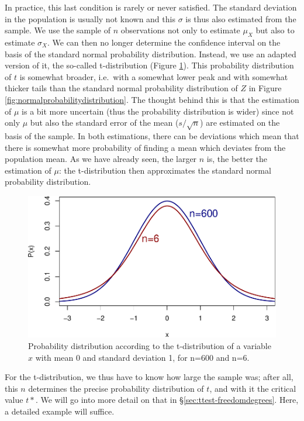 \documentclass[
]{book}
\begin{document}
In practice, this last condition is rarely or never satisfied. The
standard deviation in the population is usually not known
and this \(\sigma\) is thus also estimated from the sample. We use
the sample of \(n\) observations not only to estimate \(\mu_X\) but also
to estimate \(\sigma_X\). We can then no longer determine the confidence
interval on the basis of the standard normal probability distribution. Instead,
we use an adapted version of it, the so-called t-distribution
(Figure \ref{fig:tprobabilitydistribution}). This probability distribution of
\(t\) is somewhat broader, i.e.~with a somewhat lower peak and with somewhat
thicker tails than the standard normal probability distribution of \(Z\) in
Figure \ref{fig:normalprobabilitydistribution}. The thought behind this is that
the estimation of \(\mu\) is a bit more uncertain (thus the probability distribution
is wider) since not only \(\mu\) but also the standard error of the mean
(\(s/\sqrt{n}\)) are estimated on the basis of the sample. In both estimations, there
can be deviations which mean that there is somewhat more probability of
finding a mean which deviates from the population mean.
As we have already seen, the larger \(n\) is, the better the estimation of \(\mu\):
the t-distribution then approximates the standard normal probability distribution.

\begin{figure}
\centering
\includegraphics{QMS-EN_files/figure-latex/tprobabilitydistribution-1.pdf}
\caption{\label{fig:tprobabilitydistribution}Probability distribution according to the t-distribution of a variable \(x\) with mean 0 and standard deviation 1, for n=600 and n=6.}
\end{figure}

For the t-distribution, we thus have to know how large the sample was;
after all, this \(n\) determines the precise probability distribution of \(t\),
and with it the critical value \(t*\). We will go into more detail on that
in §\ref{sec:ttest-freedomdegrees}. Here, a detailed example will
suffice.
\end{document}
